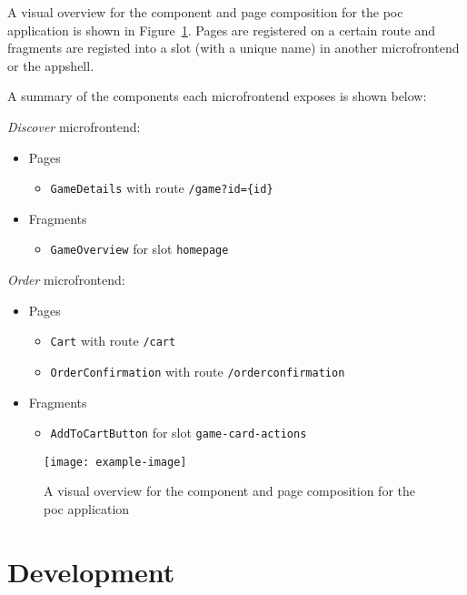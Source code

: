 A visual overview for the component and page composition for the \gls{poc}
application is shown in Figure~\ref{fig:poc-components}. Pages are registered on
a certain route and fragments are registed into a slot (with a unique name) in
another \gls{microfrontend} or the \gls{appshell}.

A summary of the components each \gls{microfrontend} exposes is shown below:
\begin{framed}
  \textit{Discover}  \gls{microfrontend}:
    \begin{itemize}
      \item[] Pages
      \begin{itemize}
        \item \texttt{GameDetails} with route \texttt{/game?id=\{id\}}
      \end{itemize}
      \item[] Fragments
      \begin{itemize}
        \item \texttt{GameOverview} for slot \texttt{homepage}
      \end{itemize}
    \end{itemize}
  \textit{Order} \gls{microfrontend}:
    \begin{itemize}
      \item[] Pages
      \begin{itemize}
        \item \texttt{Cart} with route \texttt{/cart}
        \item \texttt{OrderConfirmation} with route \texttt{/orderconfirmation}
      \end{itemize}
      \item[] Fragments
      \begin{itemize}
        \item \texttt{AddToCartButton} for slot \texttt{game-card-actions}
      \end{itemize}
    \end{itemize}
\end{framed} 


\begin{figure}
  \centering
  \texttt{[image: example-image]}  %
  \caption[Architecture overview for proof-of-concept solution]{A visual
  overview for the component and page composition for the \gls{poc}
  application}
  \label{fig:poc-components}
\end{figure}




\section{Development}
\label{sec:poc-development}

